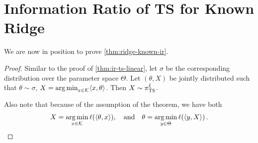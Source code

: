 \documentclass[letter, 12pt]{report}
\newcommand{\argmin}{\operatornamewithlimits{arg\,min}}
\newcommand{\cK}{\mathcal K}
\newcommand{\1}{\mathbf{1}}
\newcommand{\ts}{\textsc{TS}\xspace}
\theoremstyle{plain}
\theoremstyle{definition}
\theoremstyle{remark}
\begin{document}
\section{Information Ratio of \ts for Known Ridge}
We are now in position to prove \cref{thm:ridge-known-ir}.
\KnownRidgeLemma*
\begin{proof}
    Similar to the proof of \cref{thm:ir-ts-linear},
    let $\sigma$ be the corresponding distribution over the parameter space $\Theta$.
    Let $(\theta, X)$ be jointly distributed such that $\theta \sim \sigma$, $X = \argmin_{x \in \cK} \langle x, \theta\rangle$.
    Then $X \sim \pi_\ts^\xi$.

    Also note that because of the assumption of the theorem, we have both
    \begin{align}
        X = \argmin_{x \in \cK} \ell(\langle \theta, x \rangle),\quad \text{and} \quad
        \theta = \argmin_{y \in \Theta} \ell(\langle y, X \rangle)\,.
        \label{eq:double-greedy}
    \end{align}


\end{proof}
\end{document}
